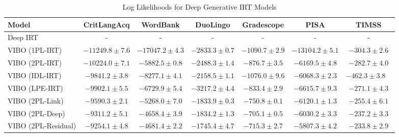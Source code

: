 \begin{table}
    \caption{Log Likelihoods for Deep Generative IRT Models}
    \centering
    \tiny
    \begin{tabular}{lcccccc}
    \hline
    Model & CritLangAcq & WordBank & DuoLingo & Gradescope & PISA & TIMSS \\
    \hline
    Deep IRT & - & - & - & - & - & - \\
    VIBO (1PL-IRT) & $-11249.8 \pm 7.6$ & $-17047.2 \pm 4.3$ & $-2833.3 \pm 0.7$ & $-1090.7 \pm 2.9$ & $-13104.2 \pm 5.1$ & $-304.3 \pm 2.6$ \\
    VIBO (2PL-IRT) & $-10224.0 \pm 7.1$ & $-5882.5 \pm 0.8$ & $-2488.3 \pm 1.4$ & $-876.7 \pm 3.5$ & $-6169.5 \pm 4.8$ & $-282.7 \pm 4.0$ \\
    VIBO (IDL-IRT) & $-9841.2 \pm 3.8$ & $-8277.1 \pm 4.1$ & $-2158.5 \pm 1.1$ & $-1076.0 \pm 9.6$ & $-6068.3 \pm 2.3$ & $-462.3 \pm 3.8$ \ \\
    VIBO (LPE-IRT) & $-9902.1 \pm 5.5$ & $-6729.9 \pm 5.4$ & $-3217.2 \pm 4.4$ & $-833.4 \pm 2.9$ & $-6615.7 \pm 9.3$ & $-271.1 \pm 4.3$ \\
    VIBO (2PL-Link) & $-9590.3 \pm 2.1$ & $-5268.0 \pm 7.0$ & $-1833.9 \pm 0.3$ & $-750.8 \pm 0.1$ & $-6120.1 \pm 1.3$ & $-255.4 \pm 6.1$ \\
    VIBO (2PL-Deep) & $-9311.2 \pm 5.1$ & $\mathbf{-4658.4} \pm 3.9$ & $-1834.2 \pm 1.3$ & $\mathbf{-705.1} \pm 0.5$ & $-6030.2 \pm 3.3$ & $-237.2 \pm 3.3$ \\
    VIBO (2PL-Residual) & $\mathbf{-9254.1} \pm 4.8$ & $-4681.4 \pm 2.2$ & $\mathbf{-1745.4} \pm 4.7$ & $-715.3 \pm 2.7$ & $\mathbf{-5807.3} \pm 4.2$ & $\mathbf{-233.8} \pm 2.9$ \\
    \hline
    \end{tabular}
    \label{table:real:nonlinear:loglike}
\end{table}

